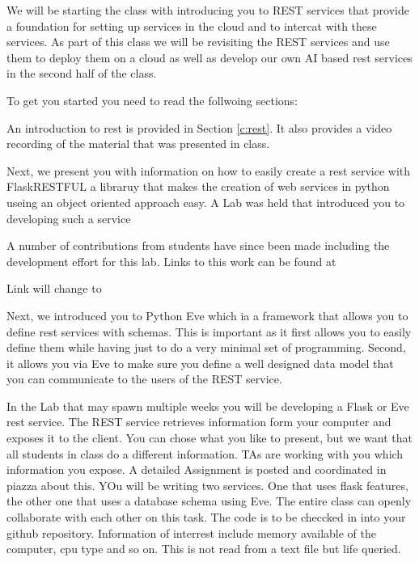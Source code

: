We will be starting the class with introducing you to REST services
that provide a foundation for setting up services in the cloud and to
intercat with these services. As part of this class we will be
revisiting the REST services and use them to deploy them on a cloud as
well as develop our own AI based rest services in the second half of
the class. 

To get you started you need to read the follwoing sections:

An introduction to rest is provided in Section \ref{c:rest}. It also
provides a video recording of the material that was presented in
class.


Next, we present you with information on how to easily create a rest
service with FlaskRESTFUL a libraruy that makes the creation of web
services in python useing an object oriented approach easy. A Lab was
held that introduced you to developing such a service


A number of contributions from students have since been made including
the development effort for this lab. Links to this work can be found
at

Link will change to 


Next, we introduced you to Python Eve which ia a framework that allows
you to define rest services with schemas. This is important as it
first allows you to easily define them while having just to do a very
minimal set of programming. Second, it allows you via Eve to make sure
you define a well designed data model that you can communicate to the
users of the REST service.


In the Lab that may spawn multiple weeks you will be developing a
Flask or Eve rest service.  The REST service retrieves information
form your computer and exposes it to the client. You can chose what
you like to present, but we want that all students in class do a
different information. TAs are working with you which information you
expose. A detailed Assignment is posted and coordinated in piazza
about this. YOu will be writing two services. One that uses flask
features, the other one that uses a database schema using Eve. The
entire class can openly collaborate with each other on this task. The
code is to be checcked in into your github repository. Information of
interrest include memory available of the computer, cpu type and so
on. This is not read from a text file but life queried.

